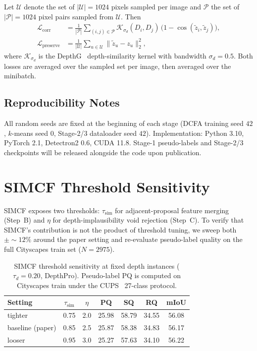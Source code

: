 \documentclass{article}
\begin{document}
Let $\mathcal{U}$ denote the set of $|\mathcal{U}| = 1024$ pixels sampled per image and $\mathcal{P}$ the set of $|\mathcal{P}| = 1024$ pixel pairs sampled from $\mathcal{U}$. Then
\begin{align*}
\mathcal{L}_\text{corr} &= \tfrac{1}{|\mathcal{P}|}\!\!\sum_{(i,j)\in\mathcal{P}} \mathcal{K}_{\sigma_d}(D_i, D_j)\,\big(1 - \cos(\tilde z_i, \tilde z_j)\big), \\
\mathcal{L}_\text{preserve} &= \tfrac{1}{|\mathcal{U}|} \sum_{u \in \mathcal{U}} \|\tilde z_u - z_u\|_2^2,
\end{align*}
where $\mathcal{K}_{\sigma_d}$ is the DepthG~\cite{sick2024depthg} depth-similarity kernel with bandwidth $\sigma_d=0.5$. Both losses are averaged over the sampled set per image, then averaged over the minibatch.

\subsection{Reproducibility Notes}
\label{sec:supp:impl:repro}

All random seeds are fixed at the beginning of each stage (DCFA training seed $42$, $k$-means seed $0$, Stage-2/3 dataloader seed $42$). Implementation: Python 3.10, PyTorch 2.1, Detectron2 0.6, CUDA 11.8. Stage-1 pseudo-labels and Stage-2/3 checkpoints will be released alongside the code upon publication.

\section{SIMCF Threshold Sensitivity}
\label{sec:supp:simcf_sweep}

SIMCF exposes two thresholds: $\tau_\text{sim}$ for adjacent-proposal feature merging (Step~B) and $\eta$ for depth-implausibility void rejection (Step~C). To verify that SIMCF's contribution is not the product of threshold tuning, we sweep both $\pm{\sim}12\%$ around the paper setting and re-evaluate pseudo-label quality on the full Cityscapes train set ($N{=}2975$).

\begin{table}[H]
\caption{SIMCF threshold sensitivity at fixed depth instances ($\tau_d{=}0.20$, DepthPro). Pseudo-label PQ is computed on Cityscapes train under the CUPS~\cite{hahn2025cups} 27-class protocol.}
\label{tab:simcf_sensitivity}
\centering
\small
\setlength{\tabcolsep}{6pt}
\begin{tabular}{l c c c c c c}
\toprule
Setting & $\tau_\text{sim}$ & $\eta$ & PQ & SQ & RQ & mIoU \\
\midrule
tighter         & 0.75 & 2.0 & 25.98 & 58.79 & 34.55 & 56.08 \\
baseline (paper) & 0.85 & 2.5 & 25.87 & 58.38 & 34.83 & 56.17 \\
looser          & 0.95 & 3.0 & 25.27 & 57.63 & 34.10 & 56.22 \\
\bottomrule
\end{tabular}
\end{table}
\end{document}
